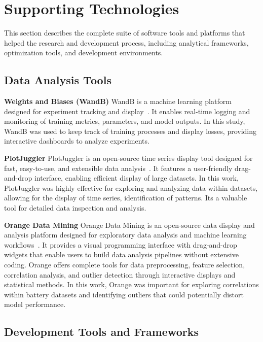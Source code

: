 \section{Supporting Technologies}

This section describes the complete suite of software tools and platforms that helped the research and development process, including analytical frameworks, optimization tools, and development environments.

\subsection{Data Analysis Tools}


\textbf{Weights and Biases (WandB)}
\label{subsec:wandb}
WandB is a machine learning platform designed for experiment tracking and display~\cite{noauthor_weights_nodate}. It enables real-time logging and monitoring of training metrics, parameters, and model outputs. In this study, WandB was used to keep track of training processes and display losses, providing interactive dashboards to analyze experiments.

\textbf{PlotJuggler}
PlotJuggler is an open-source time series display tool designed for fast, easy-to-use, and extensible data analysis~\cite{faconti_facontidavideplotjuggler_2025}. It features a user-friendly drag-and-drop interface, enabling efficient display of large datasets. In this work, PlotJuggler was highly effective for exploring and analyzing data within datasets, allowing for the display of time series, identification of patterns. Its a valuable tool for detailed data inspection and analysis.

\textbf{Orange Data Mining}
Orange Data Mining is an open-source data display and analysis platform designed for exploratory data analysis and machine learning workflows~\cite{noauthor_biolaborange3_nodate}. It provides a visual programming interface with drag-and-drop widgets that enable users to build data analysis pipelines without extensive coding. Orange offers complete tools for data preprocessing, feature selection, correlation analysis, and outlier detection through interactive displays and statistical methods. In this work, Orange was important for exploring correlations within battery datasets and identifying outliers that could potentially distort model performance.

\subsection{Development Tools and Frameworks}

